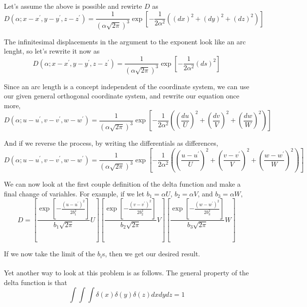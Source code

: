 Let's assume the above is possible and rewirte $D$ as
$$
D\left(\alpha ; x-x^\prime, y-y^\prime, z-z^\prime \right) =
    \frac{1}{\left(\alpha \sqrt{2\pi}\right)^3}
    \exp{ \left[ -\frac{1}{2\alpha^2} \left( (dx)^2 + (dy)^2 + (dz)^2 \right) \right] }
$$

The infinitesimal displacements in the argument to the exponent look like an arc lenght, so let's rewrite it now as
$$
D\left(\alpha ; x-x^\prime, y-y^\prime, z-z^\prime \right) =
    \frac{1}{\left(\alpha \sqrt{2\pi}\right)^3}
    \exp{ \left[ -\frac{1}{2\alpha^2} \left( ds \right)^2 \right] }
$$

Since an arc length is a concept independent of the coordinate system, we can use our given general orthogonal coordinate system,
and rewrite our equation once more,
$$
D\left(\alpha ; u-u^\prime, v-v^\prime, w-w^\prime \right) =
    \frac{1}{\left(\alpha \sqrt{2\pi}\right)^3}
    \exp{ \left[ -\frac{1}{2\alpha^2} \left( 
        \left(\frac{du}{U}\right)^2 + \left(\frac{dv}{V}\right)^2 + \left(\frac{dw}{W}\right)^2 \right) 
    \right] }
$$

And if we reverse the process, by writing the differentials as differences,
$$
D\left(\alpha ; u-u^\prime, v-v^\prime, w-w^\prime \right) =
    \frac{1}{\left(\alpha \sqrt{2\pi}\right)^3}
    \exp{ \left[ -\frac{1}{2\alpha^2} \left(
        \left(\frac{u-u^\prime}{U}\right)^2 + \left(\frac{v-v^\prime}{V}\right)^2 + \left(\frac{w-w^\prime}{W}\right)^2 \right) 
    \right] }
$$

We can now look at the first couple definition of the delta function and make a final change of variahles.
For example, if we let $b_1 = \alpha U$, $b_2 = \alpha V$, and $b_3 = \alpha W$,
$$
D =
    \left[ \frac{
            \exp{ \left[ -\frac{
                \left(u-u^\prime\right)^2
            }{2b_{1}^{2}}  \right] }
        }{b_1 \sqrt{2\pi}}
        U
     \right]
     \left[ \frac{
            \exp{ \left[ -\frac{
                \left(v-v^\prime\right)^2
            }{2b_{2}^{2}}  \right] }
        }{b_2 \sqrt{2\pi}}
        V
     \right]
     \left[ \frac{
            \exp{ \left[ -\frac{
                \left(w-w^\prime\right)^2
            }{2b_{3}^{2}}  \right] }
        }{b_3 \sqrt{2\pi}}
        W
     \right]
$$

If we now take the limit of the $b_i$s, then we get our desired result.
\\~\\

Yet another way to look at this problem is as follows.
The general property of the delta function is that
$$
\int \int \int \delta(x) \delta(y) \delta(z) dx dy dz = 1
$$

